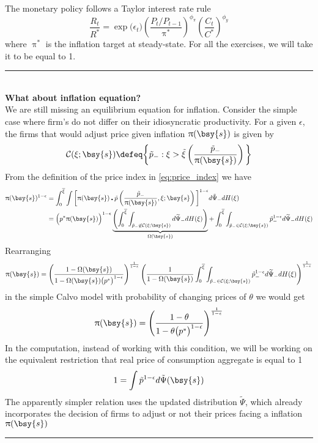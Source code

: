 \documentclass[a4paper,10pt]{article}  %
\begin{document}
The monetary policy follows a Taylor interest rate rule
\begin{equation}
   \label{eq:Taylor_rule}
   \frac{R_t}{R^*} = \exp \big( \epsilon_t \big) \left( \frac{P_t/P_{t-1}}{ \uppi^* } \right)^{ \phi_{\pi} } \left( \frac{C_t}{C^*} \right)^{ \phi_{y} } 
\end{equation}
where $ \uppi^* $ is the inflation target at steady-state. For all the exercises, we will take it to be equal to 1. 

\newpage
\rule{\textwidth}{1pt}\\ \small
{\bf\color{OrangeRed} What about inflation equation?} \\
We are still missing an equilibrium equation for inflation. Consider the simple case where firm's do not differ on their
idiosyncratic productivity. For a given $ \epsilon $, the firms that would adjust price given inflation $ \uppi(\bsy{s} ) $
is given by
\[
   \mathcal{C}(\xi; \bsy{s} ) \defeq \bigg\{ \tilde{p}_{-} : \xi > \tilde{\xi} \left( \frac{\tilde{p}_{-}}{\uppi(\bsy{s})} \right) \bigg\}  
\]
From the definition of the price index in \eqref{eq:price_index} we have
\begin{align*}
   \uppi(\bsy{s})^{1-\epsilon} & = 
      \int_0^{ \overline{\xi} } \int 
      \bigg[ \uppi(\bsy{s}) \centerdot \tilde{p}\left( \frac{\tilde{p}_{-}}{ \uppi(\bsy{s})}, \xi; \bsy{s} \right) \bigg]^{1-\epsilon}
      d\tilde{\Psi}_{-} dH(\xi) \\
      & = \Big(p^* \uppi(\bsy{s} ) \Big)^{1- \epsilon} 
      \underbrace{\left( 
         \int_0^{\overline{\xi}} \int_{ \tilde{p}_{-} \not\in \mathcal{C}(\xi;\bsy{s} ) } d\widetilde{\Psi}_{-} dH(\xi)
      \right)}_{ \Omega(\bsy{s}) }
      + \int_0^{\overline{\xi}} \int_{\tilde{p}_{-} \in \mathcal{C}(\xi;\bsy{s} )} \tilde{p}_{-}^{1-\epsilon} d\widetilde{\Psi}_{-} dH(\xi)
\end{align*}
Rearranging 
\[
   \uppi(\bsy{s}) = 
   \left( \frac{1-\Omega(\bsy{s})}{ 1-\Omega(\bsy{s}) \big(p^*\big)^{1-\epsilon} } \right)^{\frac{1}{1-\epsilon}}
   \left( \frac{1}{1-\Omega(\bsy{s})} \int_0^{\overline{\xi}} \int_{\tilde{p}_{-} \in \mathcal{C}(\xi;\bsy{s} )} \tilde{p}_{-}^{1-\epsilon} d\widetilde{\Psi}_{-} dH(\xi) \right)^{\frac{1}{1-\epsilon}}
\]
in the simple Calvo model with probability of changing prices of $ \theta $ we would get
\[
   \uppi(\bsy{s}) = 
   \left( \frac{1-\theta}{ 1-\theta \big(p^*\big)^{1-\epsilon} } \right)^{\frac{1}{1-\epsilon}}
\]
In the computation, instead of working with this condition, we will be working on the equivalent restriction that 
real price of consumption aggregate is equal to 1 
\[
   1 = \int \tilde{p}^{1-\epsilon} d\tilde{\Psi}(\bsy{s})
\]
The apparently simpler relation uses the updated distribution $ \widetilde{\Psi} $, which already incorporates
the decision of firms to adjust or not their prices facing a inflation $ \uppi(\bsy{s}) $ \\
\rule{\textwidth}{1pt}
\normalsize
\end{document}
